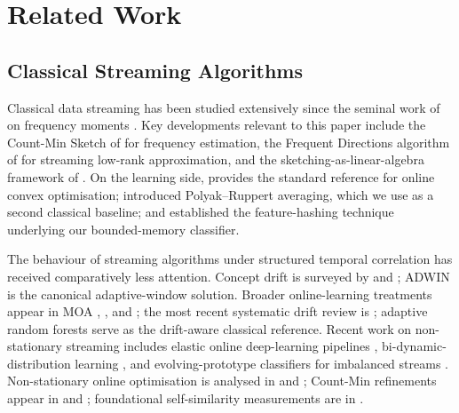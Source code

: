 \documentclass[sensors,article,submit,pdftex,moreauthors]{Definitions/mdpi}
\begin{document}
\section{Related Work}
\label{sec:related}

\subsection{Classical Streaming Algorithms}

Classical data streaming has been studied extensively since the seminal work of \citet{alon1999space} on frequency moments \citep{muthukrishnan2005data}. Key developments relevant to this paper include the Count-Min Sketch of \citet{cormode2005improved} for frequency estimation, the Frequent Directions algorithm of \citet{ghashami2016frequent} for streaming low-rank approximation, and the sketching-as-linear-algebra framework of \citet{woodruff2014sketching}. On the learning side, \citet{shalev2012online} provides the standard reference for online convex optimisation; \citet{polyak1992averaging} introduced Polyak--Ruppert averaging, which we use as a second classical baseline; and \citet{weinberger2009featurehashing} established the feature-hashing technique underlying our bounded-memory classifier.

The behaviour of streaming algorithms under structured temporal correlation has received comparatively less attention. Concept drift is surveyed by \citet{gama2014driftsurvey} and \citet{ditzler2015nonstationary}; ADWIN \citep{bifet2007adwin} is the canonical adaptive-window solution. Broader online-learning treatments appear in MOA \citep{bifet2010moa}, \citet{hoi2021online}, and \citet{gama2010knowledge}; the most recent systematic drift review is \citet{arora2024driftreview}; adaptive random forests \citep{gomes2017adaptiverf} serve as the drift-aware classical reference. Recent work on non-stationary streaming includes elastic online deep-learning pipelines \citep{su2024elasticonline}, bi-dynamic-distribution learning \citep{yan2024bidynamic}, and evolving-prototype classifiers for imbalanced streams \citep{wu2024evolvingprototypes}. Non-stationary online optimisation is analysed in \citet{besbes2015non} and \citet{ben2010agnostic}; Count-Min refinements appear in \citet{benmazziane2022countmin} and \citet{cormode2011synopses}; foundational self-similarity measurements are in \citet{park2000selfsimilar}.
\end{document}
